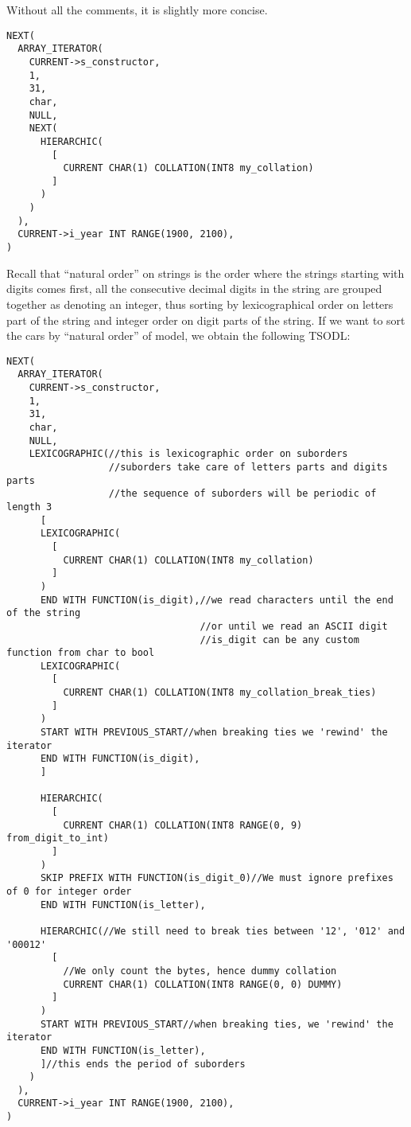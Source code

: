 \documentclass[a4paper,11pt]{report}
\begin{document}
Without all the comments, it is slightly more concise.
\begin{verbatim}
NEXT(
  ARRAY_ITERATOR(
    CURRENT->s_constructor,
    1,
    31,
    char,
    NULL,
    NEXT(
      HIERARCHIC(
        [
          CURRENT CHAR(1) COLLATION(INT8 my_collation)
        ]
      )
    )
  ),
  CURRENT->i_year INT RANGE(1900, 2100),
)
\end{verbatim}

Recall that ``natural order'' on strings is the order where the strings starting with digits comes first,
all the consecutive decimal digits in the string are grouped together as denoting an integer,
thus sorting by lexicographical order on letters part of the string and integer order on digit parts of the string.
If we want to sort the cars by ``natural order'' of model, we obtain the following TSODL:
\begin{verbatim}
NEXT(
  ARRAY_ITERATOR(
    CURRENT->s_constructor,
    1,
    31,
    char,
    NULL,
    LEXICOGRAPHIC(//this is lexicographic order on suborders
                  //suborders take care of letters parts and digits parts
                  //the sequence of suborders will be periodic of length 3
      [
      LEXICOGRAPHIC(
        [
          CURRENT CHAR(1) COLLATION(INT8 my_collation)
        ]
      )
      END WITH FUNCTION(is_digit),//we read characters until the end of the string
                                  //or until we read an ASCII digit
                                  //is_digit can be any custom function from char to bool
      LEXICOGRAPHIC(
        [
          CURRENT CHAR(1) COLLATION(INT8 my_collation_break_ties)
        ]
      )
      START WITH PREVIOUS_START//when breaking ties we 'rewind' the iterator
      END WITH FUNCTION(is_digit),
      ]

      HIERARCHIC(
        [
          CURRENT CHAR(1) COLLATION(INT8 RANGE(0, 9) from_digit_to_int)
        ]
      )
      SKIP PREFIX WITH FUNCTION(is_digit_0)//We must ignore prefixes of 0 for integer order
      END WITH FUNCTION(is_letter),

      HIERARCHIC(//We still need to break ties between '12', '012' and '00012'
        [
          //We only count the bytes, hence dummy collation
          CURRENT CHAR(1) COLLATION(INT8 RANGE(0, 0) DUMMY)
        ]
      )
      START WITH PREVIOUS_START//when breaking ties, we 'rewind' the iterator
      END WITH FUNCTION(is_letter),
      ]//this ends the period of suborders
    )
  ),
  CURRENT->i_year INT RANGE(1900, 2100),
)
\end{verbatim}
\end{document}
